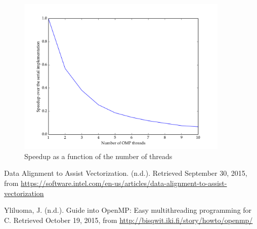 \documentclass[11pt]{article}
\begin{document}
 \begin{figure}[H]
    \includegraphics[width=0.9\textwidth]{./weak_scaling/weak_scaling.png}
    \caption{Speedup as a function of the number of threads}
    \label{fig:weak_scaling}
\end{figure} 



\begin{thebibliography}{9}
Data Alignment to Assist Vectorization. (n.d.). Retrieved September 30, 2015, from \url{https://software.intel.com/en-us/articles/data-alignment-to-assist-vectorization}

Yliluoma, J. (n.d.). Guide into OpenMP: Easy multithreading programming for C. Retrieved October 19, 2015, from \url{http://bisqwit.iki.fi/story/howto/openmp/}

\end{thebibliography}

 
 
\end{document}
